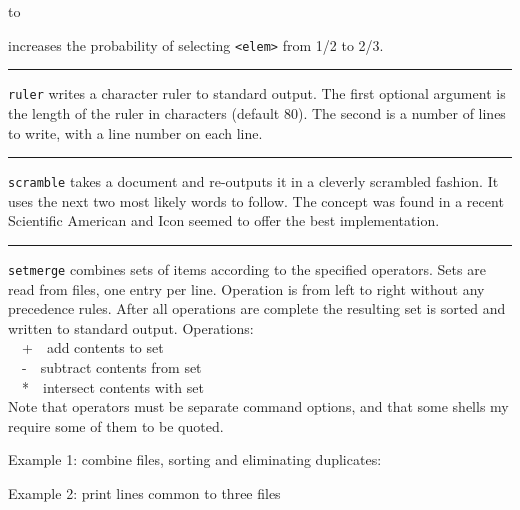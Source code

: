 {{{{{{{{{{{{{{{{{{{{{to


increases the probability of selecting
\texttt{{\textless}elem{\textgreater}} from 1/2 to 2/3. 

\vspace{0.25cm}\hrule{}

\texttt{ruler} writes a character ruler to standard output. The first
optional argument is the length of the ruler in characters (default
80). The second is a number of lines to write, with a line number on
each line.

\vspace{0.25cm}\hrule{}

\texttt{scramble} takes a document and re-outputs it in a cleverly
scrambled fashion. It uses the next two most likely words to follow.
The concept was found in a recent Scientific American and Icon seemed
to offer the best implementation.

\vspace{0.25cm}\hrule{}

\texttt{setmerge} combines sets of items according to the specified
operators. Sets are read from files, one entry per line. Operation is
from left to right without any precedence rules. After all operations
are complete the resulting set is sorted and written to standard
output. Operations:\\
\ \ +\ \ add contents to set\\
\ \ {}-\ \ subtract contents from set\\
\ \ *\ \ intersect contents with set\\
Note that operators must be separate command options, and that some
shells my require some of them to be quoted.

Example 1: combine files, sorting and eliminating duplicates:


Example 2: print lines common to three files


}}}}}}}}}}}}}}}}}}}}}
